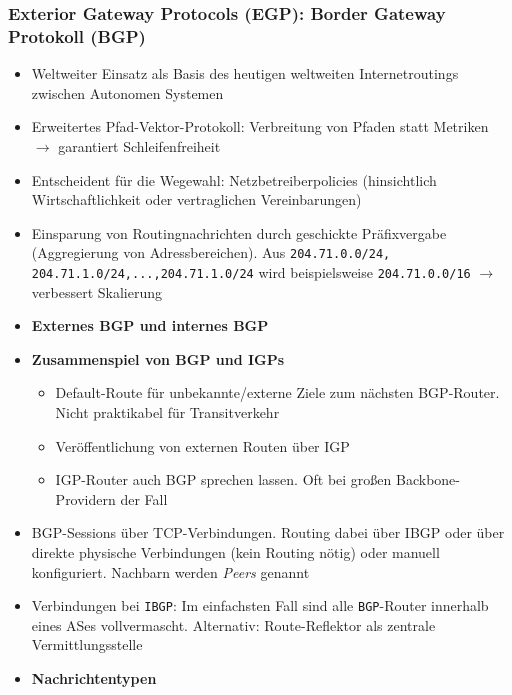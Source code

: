 \subsubsection{Exterior Gateway Protocols (EGP): Border Gateway Protokoll (BGP)}
\begin{itemize}
	\item Weltweiter Einsatz als Basis des heutigen weltweiten Internetroutings zwischen Autonomen Systemen
	\item Erweitertes Pfad-Vektor-Protokoll: Verbreitung von Pfaden statt Metriken \(\rightarrow\) garantiert Schleifenfreiheit
	\item Entscheident für die Wegewahl: Netzbetreiberpolicies (hinsichtlich Wirtschaftlichkeit oder vertraglichen Vereinbarungen)
	\item Einsparung von Routingnachrichten durch geschickte Präfixvergabe (Aggregierung von Adressbereichen). Aus \texttt{204.71.0.0/24, 204.71.1.0/24,...,204.71.1.0/24} wird beispielsweise \texttt{204.71.0.0/16} \(\rightarrow\) verbessert Skalierung
	\item \textbf{Externes BGP und internes BGP}
	\item \textbf{Zusammenspiel von BGP und IGPs}
	\begin{itemize}
		\item Default-Route für unbekannte/externe Ziele zum nächsten BGP-Router. Nicht praktikabel für Transitverkehr
		\item Veröffentlichung von externen Routen über IGP
		\item IGP-Router auch BGP sprechen lassen. Oft bei großen Backbone-Providern der Fall
	\end{itemize}
	\item BGP-Sessions über TCP-Verbindungen. Routing dabei über IBGP oder über direkte physische Verbindungen (kein Routing nötig) oder manuell konfiguriert. Nachbarn werden \textit{Peers} genannt
	\item Verbindungen bei \texttt{IBGP}: Im einfachsten Fall sind alle \texttt{BGP}-Router innerhalb eines ASes vollvermascht. Alternativ: Route-Reflektor als zentrale Vermittlungsstelle
	\item \textbf{Nachrichtentypen}

\end{itemize}
